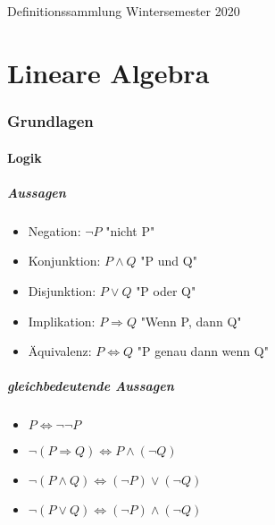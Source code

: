 \documentclass[titlepage]{article}
\newcommand{\1}{\mathbb{1}}
\newcommand{\0}{\mathbb{0}}
\begin{document}
	
	\begin{center}
		\hrulefill\\
		\begin{center}
			\quad\\
			\LARGE Definitionssammlung Wintersemester 2020 \normalsize\\
		\end{center}
		\hrulefill
		\date{\today}
	\end{center}
	\tableofcontents
	
	\part*{Lineare Algebra}
		\section{Grundlagen}
			\subsection{Logik}
				\subsubsection{Aussagen}
					\begin{itemize}
						\item Negation: $\neg P$ "nicht P"
						\item Konjunktion: $P\wedge Q$ "P und Q"
						\item Disjunktion: $P\vee Q$ "P oder Q"
						\item Implikation: $P\Rightarrow Q$ "Wenn P, dann Q"
						\item Äquivalenz: $P\Leftrightarrow Q$ "P genau dann wenn Q"
					\end{itemize}
				\subsubsection{gleichbedeutende Aussagen}
					\begin{itemize}
						\item $P\Leftrightarrow \neg\neg P$
						\item $\neg(P\Rightarrow Q)\Leftrightarrow P\wedge (\neg Q)$
						\item $\neg(P\wedge Q)\Leftrightarrow(\neg P)\vee(\neg Q)$
						\item $\neg(P\vee Q)\Leftrightarrow(\neg P)\wedge(\neg Q)$
					\end{itemize}
\end{document}
